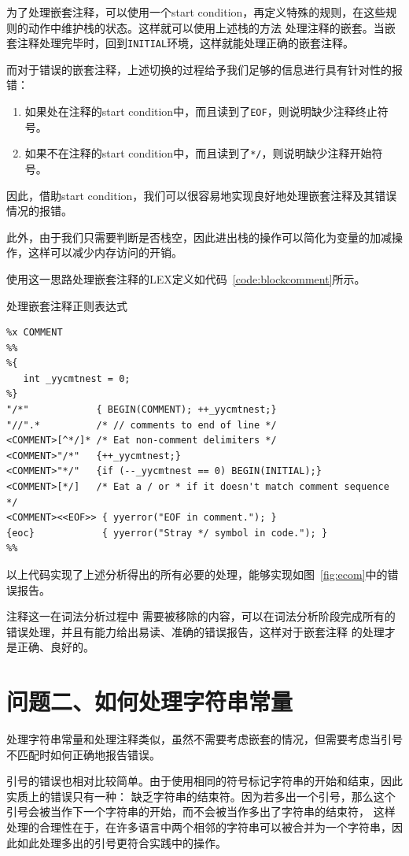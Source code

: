 \documentclass[a4paper,twoside]{article}
\begin{document}
\begin{spacing}{1.2}
为了处理嵌套注释，可以使用一个start condition，再定义特殊的规则，在这些规则的动作中维护栈的状态。这样就可以使用上述栈的方法
处理注释的嵌套。当嵌套注释处理完毕时，回到\texttt{INITIAL}环境，这样就能处理正确的嵌套注释。

而对于错误的嵌套注释，上述切换的过程给予我们足够的信息进行具有针对性的报错：
\begin{enumerate}
	\item 如果处在注释的start condition中，而且读到了\texttt{EOF}，则说明缺少注释终止符号。
	\item 如果不在注释的start condition中，而且读到了\texttt{*/}，则说明缺少注释开始符号。
\end{enumerate}
因此，借助start condition，我们可以很容易地实现良好地处理嵌套注释及其错误情况的报错。

此外，由于我们只需要判断是否栈空，因此进出栈的操作可以简化为变量的加减操作，这样可以减少内存访问的开销。

使用这一思路处理嵌套注释的LEX定义如代码~\ref{code:blockcomment}所示。
\begin{listing}[htb]
	\caption{处理嵌套注释正则表达式}
	\label{code:blockcomment}
	\begin{verbatim}
%x COMMENT
%%
%{
   int _yycmtnest = 0;
%}
"/*"            { BEGIN(COMMENT); ++_yycmtnest;}
"//".*          /* // comments to end of line */
<COMMENT>[^*/]* /* Eat non-comment delimiters */
<COMMENT>"/*"   {++_yycmtnest;}
<COMMENT>"*/"   {if (--_yycmtnest == 0) BEGIN(INITIAL);}
<COMMENT>[*/]   /* Eat a / or * if it doesn't match comment sequence */
<COMMENT><<EOF>> { yyerror("EOF in comment."); }
{eoc}            { yyerror("Stray */ symbol in code."); }
%%
	\end{verbatim}
\end{listing}

以上代码实现了上述分析得出的所有必要的处理，能够实现如图~\ref{fig:ecom}中的错误报告。

注释这一在词法分析过程中
需要被移除的内容，可以在词法分析阶段完成所有的错误处理，并且有能力给出易读、准确的错误报告，这样对于嵌套注释
的处理才是正确、良好的。

\section{问题二、如何处理字符串常量}

处理字符串常量和处理注释类似，虽然不需要考虑嵌套的情况，但需要考虑当引号不匹配时如何正确地报告错误。

引号的错误也相对比较简单。由于使用相同的符号标记字符串的开始和结束，因此实质上的错误只有一种：
缺乏字符串的结束符。因为若多出一个引号，那么这个引号会被当作下一个字符串的开始，而不会被当作多出了字符串的结束符，
这样处理的合理性在于，在许多语言中两个相邻的字符串可以被合并为一个字符串，因此如此处理多出的引号更符合实践中的操作。


\end{spacing}
\end{document}
